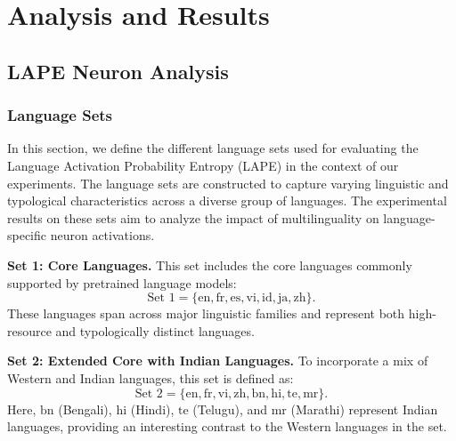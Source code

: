 
\chapter{Analysis and Results}\singlespacing %

\label{Chapter5} %



\section{LAPE Neuron Analysis}

\subsection{Language Sets}

In this section, we define the different language sets used for evaluating the Language Activation Probability Entropy (LAPE) in the context of our experiments. The language sets are constructed to capture varying linguistic and typological characteristics across a diverse group of languages. The experimental results on these sets aim to analyze the impact of multilinguality on language-specific neuron activations.

\textbf{Set 1: Core Languages.} This set includes the core languages commonly supported by pretrained language models: 
\[
\text{Set 1} = \{\text{en}, \text{fr}, \text{es}, \text{vi}, \text{id}, \text{ja}, \text{zh}\}.
\]
These languages span across major linguistic families and represent both high-resource and typologically distinct languages.

\textbf{Set 2: Extended Core with Indian Languages.} To incorporate a mix of Western and Indian languages, this set is defined as:
\[
\text{Set 2} = \{\text{en}, \text{fr}, \text{vi}, \text{zh}, \text{bn}, \text{hi}, \text{te}, \text{mr}\}.
\]
Here, \(\text{bn}\) (Bengali), \(\text{hi}\) (Hindi), \(\text{te}\) (Telugu), and \(\text{mr}\) (Marathi) represent Indian languages, providing an interesting contrast to the Western languages in the set.

